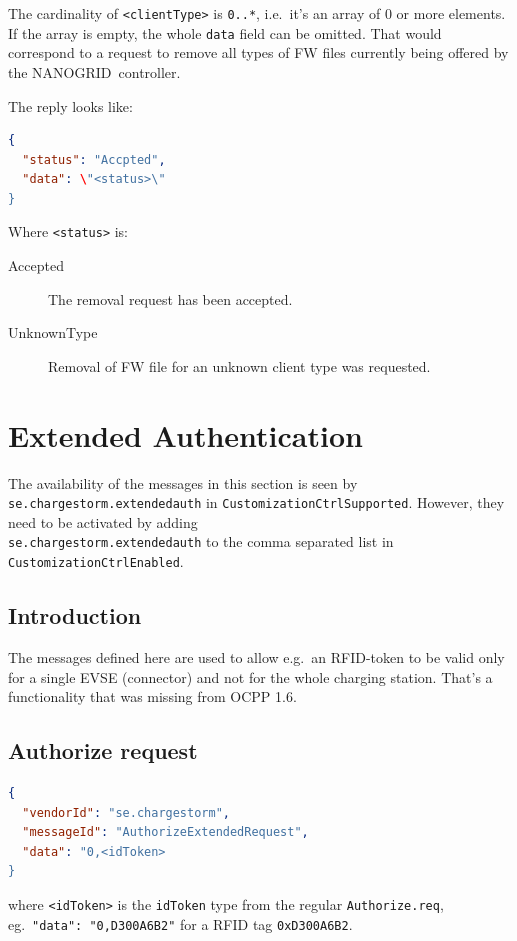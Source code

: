 \documentclass{scrartcl}
\newcommand{\nanogrid}{NANOGRID\texttrademark}
\begin{document}
The cardinality of \lstinline{<clientType>} is \lstinline{0..*}, i.e.\ it's an
array of 0 or more elements. If the array is empty, the whole \lstinline{data}
field can be omitted. That would correspond to a request to remove all types
of FW files currently being offered by the \nanogrid\ controller.

The reply looks like:
\begin{lstlisting}[language=json,caption={DataTransfer.conf to remove a FW
file, sent from the CS},captionpos=t]
{
  "status": "Accpted",
  "data": \"<status>\"
}
\end{lstlisting}
Where \lstinline{<status>} is:
\begin{description}
\item[Accepted] The removal request has been accepted.
\item[UnknownType] Removal of FW file for an unknown client type was requested.
\end{description}


\newpage
\section{Extended Authentication}
\label{sec:extend-auth}


The availability of the messages in this section is seen by
\verb|se.chargestorm.extendedauth| in
\verb|CustomizationCtrlSupported|. However, they need to be activated by
adding\\ \verb|se.chargestorm.extendedauth|  to the comma separated list in
\verb|CustomizationCtrlEnabled|.

\subsection{Introduction}
\label{sec:introduction}

The messages defined here are used to allow e.g.\ an RFID-token to be valid
only for a single EVSE (connector) and not for the whole charging
station. That's a functionality that was missing from OCPP 1.6.


\subsection{Authorize request}
\label{sec:authorize-request}

\begin{lstlisting}[language=json,caption={DataTransfer.req for
AuthorizeExtendedRequest sent from the CS},captionpos=t]
{
  "vendorId": "se.chargestorm",
  "messageId": "AuthorizeExtendedRequest",
  "data": "0,<idToken>
}
\end{lstlisting}
where \verb|<idToken>| is the \verb|idToken| type from the regular
\verb|Authorize.req|, eg.\ \verb|"data": "0,D300A6B2"| for a RFID tag
\verb|0xD300A6B2|.
\end{document}
